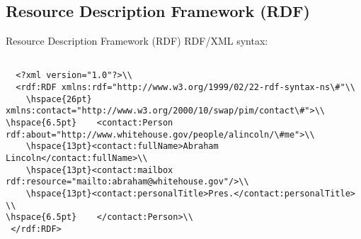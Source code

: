 \documentclass{beamer}
\begin{document}
\subsection[RDF]{Resource Description Framework (RDF)}
\begin{frame}{Resource Description Framework (RDF)}
RDF/XML syntax:
{\tiny\begin{verbatim}

  <?xml version="1.0"?>\\
  <rdf:RDF xmlns:rdf="http://www.w3.org/1999/02/22-rdf-syntax-ns\#"\\
    \hspace{26pt}           xmlns:contact="http://www.w3.org/2000/10/swap/pim/contact\#">\\
\hspace{6.5pt}    <contact:Person rdf:about="http://www.whitehouse.gov/people/alincoln/\#me">\\
    \hspace{13pt}<contact:fullName>Abraham Lincoln</contact:fullName>\\
    \hspace{13pt}<contact:mailbox rdf:resource="mailto:abraham@whitehouse.gov"/>\\
    \hspace{13pt}<contact:personalTitle>Pres.</contact:personalTitle> \\
\hspace{6.5pt}    </contact:Person>\\
 </rdf:RDF>
\end{verbatim}}
\end{frame}
\end{document}
